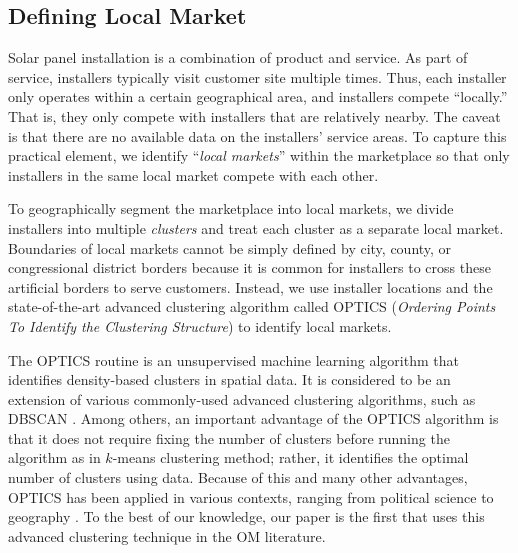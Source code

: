\documentclass[mnsc,blindrev]{informs3}
\begin{document}
	
	\subsection{Defining Local Market}
	\label{defining_local_market}
	
	
	Solar panel installation is a combination of product and service. As part of service, installers typically visit customer site multiple times. Thus, each installer only operates  within a certain geographical area, and installers compete ``locally.'' That is, they only compete with installers that are relatively nearby. The caveat is that there are no available data on the installers' service areas. To capture this practical element, we identify ``\emph{local markets}'' within the marketplace so that only installers in the same local market compete with each other.
	
	To geographically segment the marketplace into local markets, we divide installers into multiple \emph{clusters} and treat each cluster as a separate local market. Boundaries of local markets cannot be simply defined by city, county, or congressional district borders because it is common for installers to cross these artificial borders to serve customers. Instead, we use installer locations and the state-of-the-art advanced clustering algorithm called OPTICS (\textit{Ordering Points To Identify the Clustering Structure}) to identify local markets.
	
	The OPTICS routine is an unsupervised machine learning algorithm that identifies density-based clusters in spatial data. It is considered to be an extension of various commonly-used advanced clustering algorithms, such as DBSCAN \citep{kanagala2016comparative}. Among others, an important advantage of the OPTICS algorithm is that it does not require fixing the number of clusters before running the algorithm as in $k$-means clustering method; rather, it identifies the optimal number of clusters using data. Because of this and many other advantages, OPTICS has been applied in various contexts, ranging from political science \citep{davidson2019neighborhood} to geography \citep{teimouri2016method}. To the best of our knowledge, our paper is the first that uses this advanced clustering technique in the OM literature.
	
	
\end{document}
